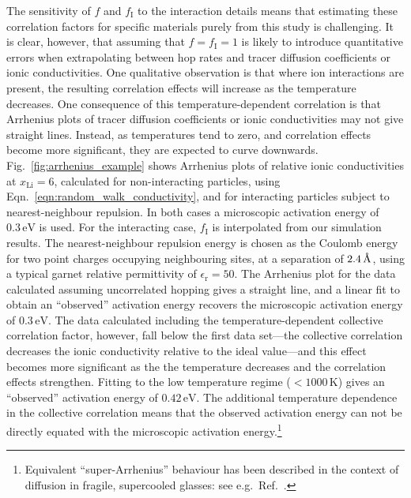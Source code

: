 \documentclass[aps,prb,twocolumn,superscriptaddress,reprint]{revtex4-1}
\newcommand{\xLi}{x_\m{Li}}
\newcommand{\angstrom}{\mbox{\normalfont\AA}}
\renewcommand{\u}[1]{\,\mathrm{#1}}
\newcommand{\m}[1]{\mathrm{#1}}
\begin{document}
The sensitivity of $f$ and $f_\m{I}$ to the interaction details means that estimating these correlation factors for specific materials purely from this study is challenging. It is clear, however, that assuming that $f=f_\m{I}=1$ is likely to introduce quantitative errors when extrapolating between hop rates and tracer diffusion coefficients or ionic conductivities. One qualitative observation is that where ion interactions are present, the resulting correlation effects will increase as the temperature decreases. One consequence of this temperature-dependent correlation is that Arrhenius plots of tracer diffusion coefficients or ionic conductivities may not give  straight lines. Instead, as temperatures tend to zero, and correlation effects become more significant, they are expected to curve downwards. Fig.~\ref{fig:arrhenius_example} shows Arrhenius plots of relative ionic conductivities at $\xLi=6$, calculated for non-interacting particles, using Eqn.~\ref{eqn:random_walk_conductivity}, and for interacting particles subject to nearest-neighbour repulsion. In both cases a microscopic activation energy of $0.3\u{eV}$ is used. For the interacting case, $f_\m{I}$ is interpolated from our simulation results. The nearest-neighbour repulsion energy is chosen as the Coulomb energy for two point charges occupying neighbouring sites, at a separation of $2.4\u{\angstrom}$, using a typical garnet relative permittivity of $\epsilon_\mathrm{r}=50$.\cite{RettenwanderEtAl_InorgChem2015} The Arrhenius plot for the data calculated assuming uncorrelated hopping gives a straight line, and a linear fit to obtain an ``observed'' activation energy recovers the microscopic activation energy of $0.3\u{eV}$. The data calculated including the temperature-dependent collective correlation factor, however, fall below the first data set---the collective correlation decreases the ionic conductivity relative to the ideal value---and this effect becomes more significant as the  the temperature decreases and the correlation effects strengthen. Fitting to the low temperature regime ($<1000\u{K}$) gives an ``observed'' activation energy of $0.42\u{eV}$. The additional temperature dependence in the collective correlation means that the observed activation energy can not be directly equated with the microscopic activation energy.\footnote{Equivalent ``super-Arrhenius'' behaviour has been described in the context of diffusion in fragile, supercooled glasses: see e.g.\ Ref.~.}
\end{document}
